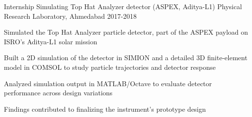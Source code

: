 \begin{cventries}
  \cventry
    {Internship} %
    {Simulating Top Hat Analyzer detector (ASPEX, Aditya-L1)} %
    {Physical Research Laboratory, Ahmedabad} %
    {2017-2018} %
    {
      \begin{cvitems} %
        \item {Simulated the Top Hat Analyzer particle detector, part of the ASPEX payload on ISRO's Aditya-L1 solar mission}
        \item {Built a 2D simulation of the detector in SIMION and a detailed 3D finite-element model in COMSOL to study particle trajectories and detector response}
        \item {Analyzed simulation output in MATLAB/Octave to evaluate detector performance across design variations}
        \item {Findings contributed to finalizing the instrument's prototype design}
      \end{cvitems}
    }

\end{cventries}

